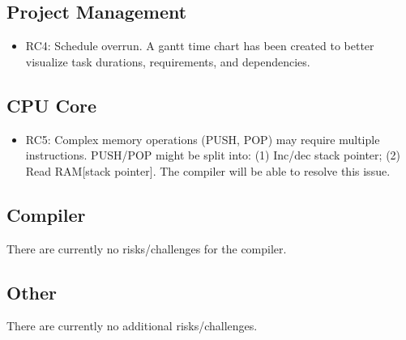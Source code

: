 \documentclass[11pt,a4paper]{article}
\begin{document}
\subsection{Project Management}
\begin{itemize}
\item{{\color{gray} RC4: Schedule overrun. A gantt time chart has been created to better visualize task durations, requirements, and dependencies.}}
\end{itemize}

\subsection{CPU Core}
\begin{itemize}
\item{{\color{orange} RC5: Complex memory operations (PUSH, POP) may require multiple instructions. PUSH/POP might be split into: (1) Inc/dec stack pointer; (2) Read RAM[stack pointer]. The compiler will be able to resolve this issue.}}
\end{itemize}


\subsection{Compiler}
There are currently no risks/challenges for the compiler.

\subsection{Other}
There are currently no additional risks/challenges.

\newpage
 
\end{document}

